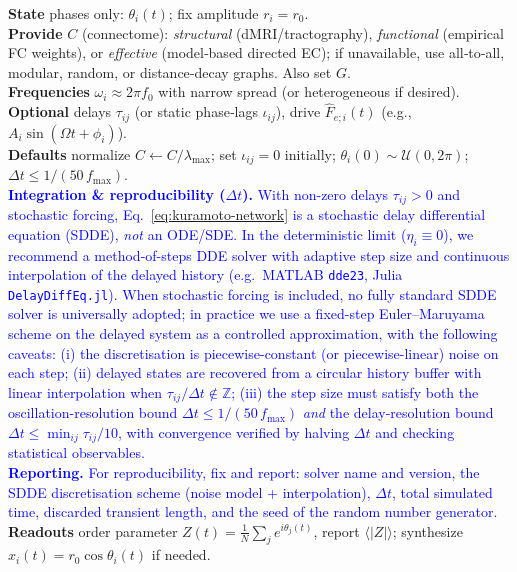 \documentclass[12pt]{article}
\numberwithin{equation}{section}
\newcommand{\rev}[1]{\textcolor{blue}{#1}}
\begin{document}
\begin{tcolorbox}[
  colback=gray!5,
  colframe=slate,
  colbacktitle=softblue!25,
  coltitle=softblue!60!black,
  fonttitle=\bfseries\small,
  title={\small How to Use It},
  boxrule=0.4pt,
  enhanced, sharp corners,
  left=4pt,right=4pt,top=3pt,bottom=3pt,
  boxsep=2pt,
  before skip=6pt, after skip=6pt
]
\scriptsize
\textbf{State} phases only: $\theta_i(t)$; fix amplitude $r_i=r_0$.\\
\textbf{Provide} $C$ (connectome): \emph{structural} (dMRI/tractography), \emph{functional} (empirical FC weights), or \emph{effective} (model‑based directed EC); if unavailable, use all‑to‑all, modular, random, or distance‑decay graphs. Also set $G$.\\
\textbf{Frequencies} $\omega_i\!\approx\!2\pi f_0$ with narrow spread (or heterogeneous if desired).\\
\textbf{Optional} delays $\tau_{ij}$ (or static phase‑lags $\iota_{ij}$), drive $\hat F_{e;i}(t)$ (e.g., $A_i\sin(\Omega t+\phi_i)$).\\
\textbf{Defaults} normalize $C\leftarrow C/\lambda_{\max}$; set $\iota_{ij}=0$ initially; $\theta_i(0)\sim\mathcal U(0,2\pi)$; $\Delta t\le 1/(50\,f_{\max})$.\\
\rev{\textbf{Integration \& reproducibility ($\Delta t$).}
With non-zero delays $\tau_{ij}>0$ and stochastic forcing, Eq.~\eqref{eq:kuramoto-network} is a stochastic delay differential equation (SDDE), \emph{not} an ODE/SDE. In the deterministic limit ($\eta_i\equiv 0$), we recommend a method-of-steps DDE solver with adaptive step size and continuous interpolation of the delayed history (e.g.\ MATLAB \texttt{dde23}, Julia \texttt{DelayDiffEq.jl}). When stochastic forcing is included, no fully standard SDDE solver is universally adopted; in practice we use a fixed-step Euler--Maruyama scheme on the delayed system as a controlled approximation, with the following caveats: (i) the discretisation is piecewise-constant (or piecewise-linear) noise on each step; (ii) delayed states are recovered from a circular history buffer with linear interpolation when $\tau_{ij}/\Delta t \notin \mathbb{Z}$; (iii) the step size must satisfy both the oscillation-resolution bound $\Delta t \leq 1/(50\,f_{\max})$ \emph{and} the delay-resolution bound $\Delta t \leq \min_{ij}\tau_{ij}/10$, with convergence verified by halving $\Delta t$ and checking statistical observables.\\
\textbf{Reporting.} For reproducibility, fix and report: solver name and version, the SDDE discretisation scheme (noise model + interpolation), $\Delta t$, total simulated time, discarded transient length, and the seed of the random number generator.}
\textbf{Readouts} order parameter $Z(t)=\frac{1}{N}\sum_j e^{i\theta_j(t)}$, report $\langle|Z|\rangle$; synthesize $x_i(t)=r_0\cos\theta_i(t)$ if needed.
\end{tcolorbox}
\end{document}
